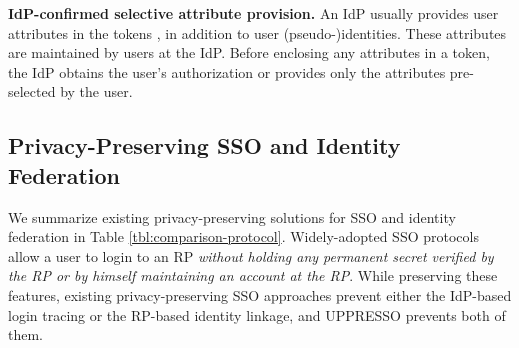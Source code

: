 
\noindent\textbf{IdP-confirmed selective attribute provision.}
An IdP usually provides user attributes in the tokens \cite{OpenIDConnect,rfc6749}, in addition to user (pseudo-)identities.
These attributes are maintained by users at the IdP.
Before enclosing any attributes in a token, the IdP obtains the user's authorization or provides only the attributes pre-selected by the user.

%



\subsection{Privacy-Preserving SSO and Identity Federation}
\label{subsec-solutions}

We summarize existing privacy-preserving solutions for SSO and identity federation in Table \ref{tbl:comparison-protocol}.
Widely-adopted SSO protocols \cite{OpenIDConnect,rfc6749,SAML,SAMLIdentifier} allow a user to login to an RP
\emph{without holding any permanent secret verified by the RP or by himself maintaining an account at the RP}.
While preserving these features, existing privacy-preserving SSO approaches \cite{BrowserID,SPRESSO,NIST2017draft} prevent either the IdP-based login tracing or the RP-based identity linkage, and UPPRESSO prevents both of them.


